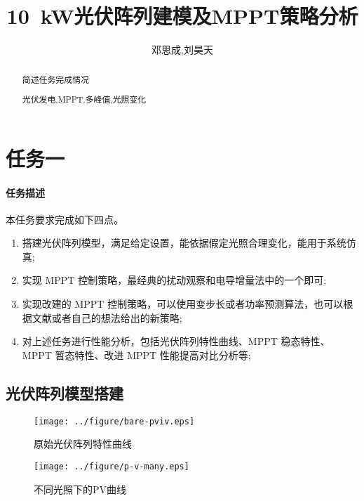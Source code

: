 \documentclass[a4paper,12pt]{article}
\title{\SI{10}{\kW}光伏阵列建模及MPPT策略分析}
\author{邓思成,刘昊天}
\begin{document}
    \begin{abstract}
        简述任务完成情况
        \begin{keywords}
            光伏发电,MPPT,多峰值,光照变化
        \end{keywords}
    \end{abstract}
    \maketitle
    \section{任务一} %
    \label{sec:任务一}
    \paragraph{任务描述} %
    本任务要求完成如下四点。
    \begin{enumerate}[noitemsep,topsep=0pt]
    \item 搭建光伏阵列模型，满足给定设置，能依据假定光照合理变化，能用于系统仿真;
    \item 实现 MPPT 控制策略，最经典的扰动观察和电导增量法中的一个即可;
    \item 实现改建的 MPPT 控制策略，可以使用变步长或者功率预测算法，也可以根据文献或者自己的想法给出的新策略;
    \item 对上述任务进行性能分析，包括光伏阵列特性曲线、MPPT 稳态特性、MPPT 暂态特性、改进 MPPT 性能提高对比分析等;
    \end{enumerate}

    \subsection{光伏阵列模型搭建} %
    \label{sub:光伏阵列模型搭建}
    \begin{figure}[htbp]
        \centering
        \texttt{[image: ../figure/bare-pviv.eps]}
        \caption{原始光伏阵列特性曲线}
        \label{fig:bare-pviv}
    \end{figure}
    \begin{figure}[htbp]
        \centering
        \texttt{[image: ../figure/p-v-many.eps]}
        \caption{不同光照下的PV曲线}
        \label{fig:p-v-many}
    \end{figure}
\end{document}
